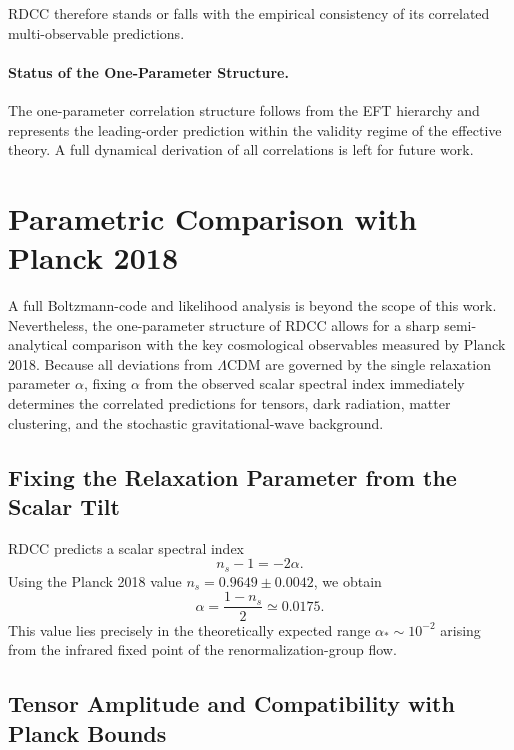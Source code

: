 \documentclass[11pt,a4paper]{article}
\begin{document}
RDCC therefore stands or falls with the empirical consistency of its correlated
multi-observable predictions.

\paragraph{Status of the One-Parameter Structure.}
The one-parameter correlation structure follows from the EFT hierarchy and
represents the leading-order prediction within the validity regime of the
effective theory. A full dynamical derivation of all correlations is left for
future work.


\clearpage

\section{Parametric Comparison with Planck 2018}
\label{sec:planck_comparison}

A full Boltzmann-code and likelihood analysis is beyond the scope of this work.
Nevertheless, the one-parameter structure of RDCC allows for a sharp
semi-analytical comparison with the key cosmological observables measured by
Planck 2018. Because all deviations from $\Lambda$CDM are governed by the single
relaxation parameter $\alpha$, fixing $\alpha$ from the observed scalar spectral
index immediately determines the correlated predictions for tensors, dark
radiation, matter clustering, and the stochastic gravitational-wave background.

\subsection{Fixing the Relaxation Parameter from the Scalar Tilt}

RDCC predicts a scalar spectral index
\begin{equation}
    n_s - 1 = -2\alpha.
\end{equation}
Using the Planck 2018 value $n_s = 0.9649 \pm 0.0042$, we obtain
\begin{equation}
    \alpha = \frac{1 - n_s}{2}
    \simeq 0.0175.
\end{equation}
This value lies precisely in the theoretically expected range
$\alpha_* \sim 10^{-2}$ arising from the infrared fixed point of the
renormalization-group flow.

\subsection{Tensor Amplitude and Compatibility with Planck Bounds}
\end{document}

